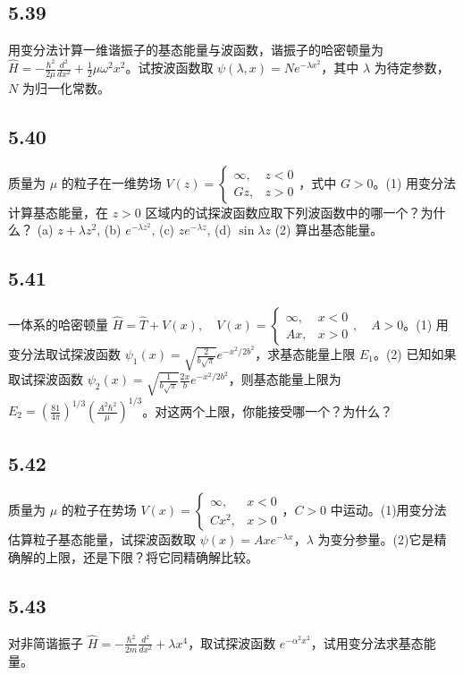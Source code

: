 \subsection{5.39}
用变分法计算一维谐振子的基态能量与波函数，谐振子的哈密顿量为 $\hat{H} = -\frac{\hbar^2}{2\mu} \frac{d^2}{dx^2} + \frac{1}{2}\mu\omega^2 x^2$。试按波函数取 $\psi(\lambda, x) = Ne^{-\lambda x^2}$，其中 $\lambda$ 为待定参数，$N$ 为归一化常数。

\subsection{5.40}
质量为 $\mu$ 的粒子在一维势场 $V(z) = \begin{cases} \infty, & z < 0 \\ Gz, & z > 0 \end{cases}$，式中 $G > 0$。(1) 用变分法计算基态能量，在 $z > 0$ 区域内的试探波函数应取下列波函数中的哪一个？为什么？
(a) $z + \lambda z^2$, (b) $e^{-\lambda z^2}$, (c) $ze^{-\lambda z}$, (d) $\sin \lambda z$
(2) 算出基态能量。

\subsection{5.41}
一体系的哈密顿量 $\hat{H} = \hat{T} + V(x), \quad V(x) = \begin{cases} \infty, & x < 0 \\ Ax, & x > 0 \end{cases}, \quad A > 0$。(1) 用变分法取试探波函数 $\psi_1(x) = \sqrt{\frac{2}{b\sqrt{\pi}}} e^{-x^2 / 2b^2}$，求基态能量上限 $E_1$。(2) 已知如果取试探波函数 $\psi_2(x) = \sqrt{\frac{1}{b\sqrt{\pi}}} \frac{2x}{b} e^{-x^2 / 2b^2}$，则基态能量上限为 $E_2 = \left( \frac{81}{4\pi} \right)^{1/3} \left( \frac{A^2 \hbar^2}{\mu} \right)^{1/3}$。对这两个上限，你能接受哪一个？为什么？

\subsection{5.42}
质量为 $\mu$ 的粒子在势场 $V(x) = \begin{cases} \infty, & x < 0 \\ Cx^2, & x > 0 \end{cases}$，$C > 0$ 中运动。(1)用变分法估算粒子基态能量，试探波函数取 $\psi(x) = Axe^{-\lambda x}$，$\lambda$ 为变分参量。(2)它是精确解的上限，还是下限？将它同精确解比较。

\subsection{5.43}
对非简谐振子 $\hat{H} = -\frac{\hbar^2}{2m}\frac{d^2}{dx^2} + \lambda x^4$，取试探波函数 $e^{-\alpha^2 x^2}$，试用变分法求基态能量。

